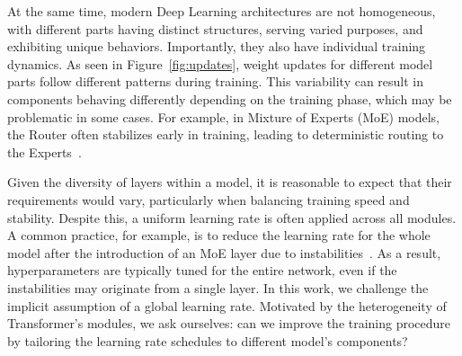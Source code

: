 \documentclass{article} %
\newcommand{\sj}[1]{\textcolor{blue}{[SJ: #1]}}
\newcommand{\jl}[1]{\textcolor{green}{[JL: #1]}}
\begin{document}
    At the same time, modern Deep Learning architectures are not homogeneous, with different parts having distinct structures, serving varied purposes, and exhibiting unique behaviors. Importantly, they also have individual training dynamics. As seen in Figure~\ref{fig:updates}, weight updates for different model parts follow different patterns during training. This variability can result in components behaving differently depending on the training phase, which may be problematic in some cases. For example, in Mixture of Experts (MoE) models, the Router often stabilizes early in training, leading to deterministic routing to the Experts~\citep{xue2024openmoe}. %






    Given the diversity of layers within a model, it is reasonable to expect that their requirements would vary, particularly when balancing training speed and stability. Despite this, a uniform learning rate is often applied across all modules. A common practice, for example, is to reduce the learning rate for the whole model after the introduction of an MoE layer due to instabilities~\citep{pmlr-v162-rajbhandari22a}. As a result, hyperparameters are typically tuned for the entire network, even if the instabilities may originate from a single layer. In this work, we challenge the implicit assumption of a global learning rate.
    Motivated by the heterogeneity of Transformer's modules, we ask ourselves: can we improve the training procedure by tailoring the learning rate schedules to different model's components? 
\end{document}
